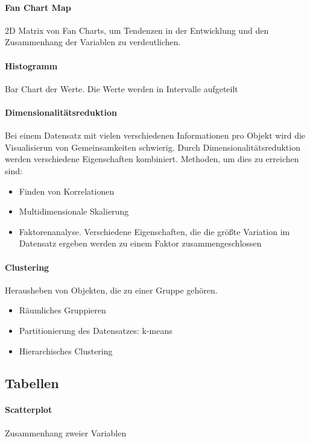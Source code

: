 \documentclass[ngerman]{scrartcl}
\begin{document}
\paragraph{Fan Chart Map} 2D Matrix von Fan Charts, um Tendenzen in der Entwicklung und den Zusammenhang der Variablen zu verdeutlichen.

\paragraph{Histogramm} Bar Chart der Werte. Die Werte werden in Intervalle aufgeteilt

\paragraph{Dimensionalitätsreduktion} Bei einem Datensatz mit vielen verschiedenen Informationen pro Objekt wird die Visualisierun von Gemeinsamkeiten schwierig. Durch Dimensionalitätsreduktion werden verschiedene Eigenschaften kombiniert. Methoden, um dies zu erreichen sind:
\begin{itemize}
  \item Finden von Korrelationen
  \item Multidimensionale Skalierung
  \item Faktorenanalyse. Verschiedene Eigenschaften, die die größte Variation im Datensatz ergeben werden zu einem Faktor zusammengeschlossen  
\end{itemize}  


\paragraph{Clustering} Herausheben von Objekten, die zu einer Gruppe gehören.
\begin{itemize}
  \item Räumliches Gruppieren
  \item Partitionierung des Datensatzes: k-means
  \item Hierarchisches Clustering
\end{itemize}


\subsection{Tabellen}
\paragraph{Scatterplot} Zusammenhang zweier Variablen
\end{document}
